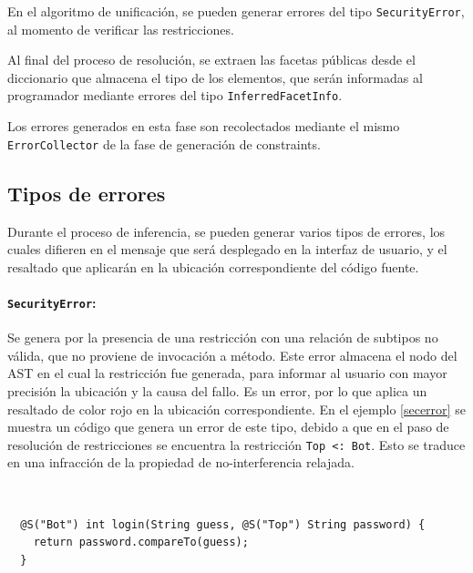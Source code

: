 En el algoritmo de unificación, se pueden generar errores del tipo \texttt{SecurityError}, al momento de verificar las restricciones.

Al final del proceso de resolución, se extraen las facetas públicas desde el diccionario que almacena el tipo de los elementos, que serán informadas al programador mediante errores del tipo \texttt{InferredFacetInfo}.

Los errores generados en esta fase son recolectados mediante el mismo \texttt{ErrorCollector} de la fase de generación de constraints.


\subsection{Tipos de errores}
Durante el proceso de inferencia, se pueden generar varios tipos de errores, los cuales difieren en el mensaje que será desplegado en la interfaz de usuario, y el resaltado que aplicarán en la ubicación correspondiente del código fuente.

\paragraph{\texttt{SecurityError}:}Se genera por la presencia de una restricción con una relación de subtipos no válida, que no proviene de invocación a método. Este error almacena el nodo del AST en el cual la restricción fue generada, para informar al usuario con mayor precisión la ubicación y la causa del fallo. Es un error, por lo que aplica un resaltado de color rojo en la ubicación correspondiente. En el ejemplo \ref{secerror} se muestra un código que genera un error de este tipo, debido a que en el paso de resolución de restricciones se encuentra la restricción \texttt{Top <: Bot}. Esto se traduce en una infracción de la propiedad de no-interferencia relajada.

\begin{ej}\ \\
  \label{secerror}
  \normalfont
  \begin{lstlisting}
  @S("Bot") int login(String guess, @S("Top") String password) {
    return password.compareTo(guess);
  }
  \end{lstlisting}
\end{ej}


